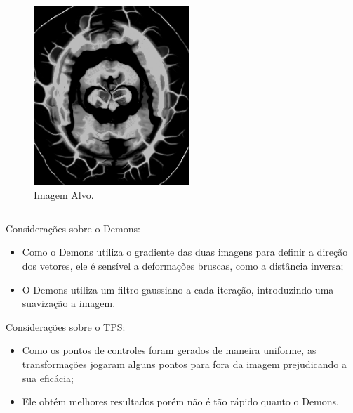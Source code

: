 \documentclass[t]{beamer}
\begin{document}
\begin{frame}
\begin{columns}[c]
\begin{figure}[!h]
\begin{center}
            \includegraphics[width=0.9\textwidth]{../images/resultSinDistDemon.png}
            \caption{Imagem Alvo.}
          \end{center}
        \end{figure}
    \end{columns}
\end{frame}

\begin{frame}
    Considerações sobre o Demons:
    \begin{itemize}
        \item Como o Demons utiliza o gradiente das duas imagens para definir a direção dos vetores, ele é sensível a deformações bruscas, como a distância inversa;
        \item O Demons utiliza um filtro gaussiano a cada iteração, introduzindo uma suavização a imagem.
    \end{itemize}
\end{frame}

\begin{frame}
    Considerações sobre o TPS:
    \begin{itemize}
        \item Como os pontos de controles foram gerados de maneira uniforme, as transformações jogaram alguns pontos para fora da imagem prejudicando a sua eficácia;
        \item Ele obtém melhores resultados porém não é tão rápido quanto o Demons.
    \end{itemize}
\end{frame}
\end{document}
